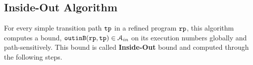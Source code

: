 \subsection{Inside-Out Algorithm}
\label{sec:inoutalg}
For every simple transition path $\mathtt{tp}$ in a refined program $\mathtt{rp}$, 
this algorithm
computes a bound, $\mathtt{outinB}(\mathtt{rp}, \mathtt{tp}) \in \mathcal{A}_{in}$
on its execution numbers globally and path-sensitively.
This bound is called \textbf{Inside-Out} bound and computed
through the following steps.
%
